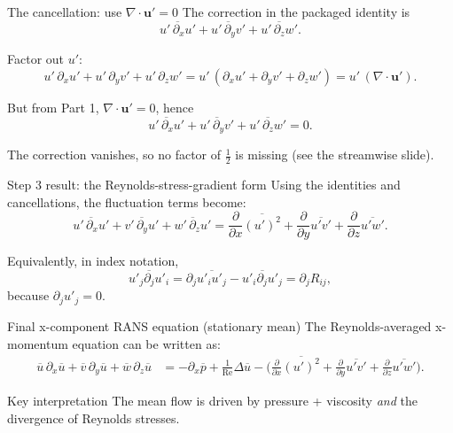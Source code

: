 \documentclass[aspectratio=169,11pt]{beamer}
\newcommand{\uu}{\bm{u}}
\newcommand{\Rey}{\mathrm{Re}}
\newcommand{\avg}[1]{\overline{#1}}
\renewcommand{\up}{\uu'} %
\newcommand{\Div}{\nabla\cdot}
\newcommand{\Lap}{\Delta}
\begin{document}
\begin{frame}{The cancellation: use $\Div \up = 0$}
The correction in the packaged identity is
\[
\avg{u'\,\partial_x u'}+\avg{u'\,\partial_y v'}+\avg{u'\,\partial_z w'}.
\]

Factor out $u'$:
\[
u'\,\partial_x u' + u'\,\partial_y v' + u'\,\partial_z w'
=
u'\,(\partial_x u'+\partial_y v'+\partial_z w')
=
u'\,(\Div\up).
\]

But from Part 1, $\Div\up=0$, hence
\[
\avg{u'\,\partial_x u'}+\avg{u'\,\partial_y v'}+\avg{u'\,\partial_z w'}=0.
\]

The correction vanishes, so no factor of $\tfrac12$ is missing (see the streamwise slide).
\end{frame}

\begin{frame}{Step 3 result: the Reynolds-stress-gradient form}
Using the identities and cancellations, the fluctuation terms become:
\[
\avg{u'\,\partial_x u'}+\avg{v'\,\partial_y u'}+\avg{w'\,\partial_z u'}
=
\frac{\partial}{\partial x}\avg{(u')^2}
+\frac{\partial}{\partial y}\avg{u'v'}
+\frac{\partial}{\partial z}\avg{u'w'}.
\]

Equivalently, in index notation,
\[
\overline{u'_j\partial_j u'_i}
=\partial_j\overline{u'_i u'_j}
-\overline{u'_i\partial_j u'_j}
=\partial_j R_{ij},
\]
because $\partial_j u'_j=0$.
\end{frame}

\begin{frame}{Final x-component RANS equation (stationary mean)}
The Reynolds-averaged x-momentum equation can be written as:
\begin{align*}
\avg{u}\,\partial_x\avg{u}
+\avg{v}\,\partial_y\avg{u}
+\avg{w}\,\partial_z\avg{u}
&=
-\partial_x\avg{p}
+\frac{1}{\Rey}\Lap\avg{u}
-\Big(
\frac{\partial}{\partial x}\avg{(u')^2}
+\frac{\partial}{\partial y}\avg{u'v'}
+\frac{\partial}{\partial z}\avg{u'w'}
\Big).
\end{align*}

\begin{block}{Key interpretation}
The mean flow is driven by pressure + viscosity \emph{and} the divergence of Reynolds stresses.
\end{block}
\end{frame}
\end{document}
